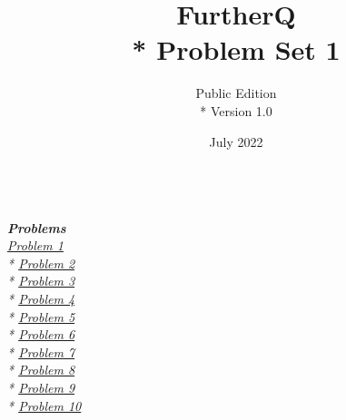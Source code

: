 
\title{FurtherQ \\* Problem Set 1}
\author{Public Edition \\* Version 1.0}
\date{July 2022}




\maketitle
\textit{
  \textbf{\\\Large{Problems}}\\
  \large
  \hyperlink{P1}{Problem 1} \\*
  \hyperlink{P2}{Problem 2} \\*
  \hyperlink{P3}{Problem 3} \\*
  \hyperlink{P4}{Problem 4} \\*
  \hyperlink{P5}{Problem 5} \\*
  \hyperlink{P6}{Problem 6} \\*
  \hyperlink{P7}{Problem 7} \\*
  \hyperlink{P8}{Problem 8} \\*
  \hyperlink{P9}{Problem 9} \\*
  \hyperlink{P10}{Problem 10} \\\\
}
